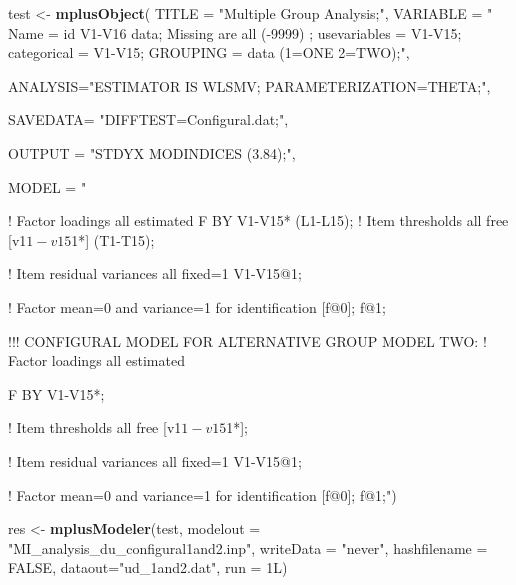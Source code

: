 \documentclass[]{book}
\newenvironment{Shaded}{\begin{snugshade}}{\end{snugshade}}
\newcommand{\DataTypeTok}[1]{\textcolor[rgb]{0.13,0.29,0.53}{#1}}
\newcommand{\KeywordTok}[1]{\textcolor[rgb]{0.13,0.29,0.53}{\textbf{#1}}}
\newcommand{\NormalTok}[1]{#1}
\newcommand{\OtherTok}[1]{\textcolor[rgb]{0.56,0.35,0.01}{#1}}
\newcommand{\StringTok}[1]{\textcolor[rgb]{0.31,0.60,0.02}{#1}}
\begin{document}
\begin{Shaded}
\begin{Highlighting}[]
\NormalTok{test <-}\StringTok{ }\KeywordTok{mplusObject}\NormalTok{(}
\DataTypeTok{TITLE =} \StringTok{"Multiple Group Analysis;"}\NormalTok{,}
\DataTypeTok{VARIABLE =} \StringTok{"}
\StringTok{Name = id V1-V16 data;}
\StringTok{Missing are all (-9999) ;}
\StringTok{usevariables = V1-V15;}
\StringTok{categorical = V1-V15;}
\StringTok{GROUPING = data (1=ONE 2=TWO);"}\NormalTok{,}

\DataTypeTok{ANALYSIS=}\StringTok{"ESTIMATOR IS WLSMV; }
\StringTok{PARAMETERIZATION=THETA;"}\NormalTok{,}

\DataTypeTok{SAVEDATA=} \StringTok{"DIFFTEST=Configural.dat;"}\NormalTok{,}

\DataTypeTok{OUTPUT =} \StringTok{"STDYX MODINDICES (3.84);"}\NormalTok{,}

\DataTypeTok{MODEL =} \StringTok{" }

\StringTok{! Factor loadings all estimated         }
\StringTok{F BY V1-V15* (L1-L15); }
\StringTok{ }
\StringTok{! Item thresholds all free     }
\StringTok{[v1$1-v15$1*] (T1-T15);    }

\StringTok{! Item residual variances all fixed=1     }
\StringTok{V1-V15@1; }

\StringTok{! Factor mean=0 and variance=1 for identification }
\StringTok{[f@0]; f@1; }

\StringTok{!!! CONFIGURAL MODEL FOR ALTERNATIVE GROUP      }
\StringTok{MODEL TWO:  ! Factor loadings all estimated          }

\StringTok{F BY V1-V15*; }

\StringTok{! Item thresholds all free     }
\StringTok{[v1$1-v15$1*]; }

\StringTok{! Item residual variances all fixed=1     }
\StringTok{V1-V15@1; }

\StringTok{! Factor mean=0 and variance=1 for identification }
\StringTok{[f@0]; f@1;"}\NormalTok{)}

\NormalTok{res <-}\StringTok{ }\KeywordTok{mplusModeler}\NormalTok{(test, }\DataTypeTok{modelout =} \StringTok{"MI_analysis_du_configural1and2.inp"}\NormalTok{, }
                    \DataTypeTok{writeData =} \StringTok{"never"}\NormalTok{, }
                    \DataTypeTok{hashfilename =} \OtherTok{FALSE}\NormalTok{, }
                    \DataTypeTok{dataout=}\StringTok{"ud_1and2.dat"}\NormalTok{, }\DataTypeTok{run =}\NormalTok{ 1L)}
\end{Highlighting}
\end{Shaded}
\end{document}
